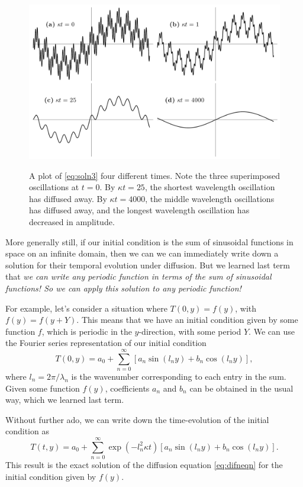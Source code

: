 \documentclass[11pt,twoside,a4paper]{article}
\begin{document}
\begin{figure}[ht]
  \centering
  \includegraphics[height=3in]{../figs/L18/decayThreeOscillations}
  \caption{A plot of \autoref{eq:soln3} four different times. Note the
    three superimposed oscillations at $t=0$.  By $\kappa t=25$, the
    shortest wavelength oscillation has diffused away. By
    $\kappa t=4000$, the middle wavelength oscillations has diffused
    away, and the longest wavelength oscillation has decreased in
    amplitude.}
  \label{fig:threeDecays}
\end{figure}

More generally still, if our initial condition is the sum of
sinusoidal functions in space on an infinite domain, then we can we
can immediately write down a solution for their temporal evolution
under diffusion.  But we learned last term that \textit{we can write
  any periodic function in terms of the sum of sinusoidal functions!
  So we can apply this solution to any periodic function!}

For example, let's consider a situation where $T(0,y) = f(y)$, with
$f(y) = f(y+Y)$.  This means that we have an initial condition given
by some function $f$, which is periodic in the $y$-direction, with
some period $Y$.  We can use the Fourier series representation of our
initial condition
\begin{equation}
  \label{eq:ICfourier}
  T(0,y) = a_0 + \sum_{n=0}^\infty\left[a_n\sin(l_n y) + b_n\cos(l_n y)\right],
\end{equation}
where $l_n=2\pi/\lambda_n$ is the wavenumber corresponding to each
entry in the sum.  Given some function $f(y)$, coefficients $a_n$ and
$b_n$ can be obtained in the usual way, which we learned last term.

Without further ado, we can write down the time-evolution of the
initial condition as
\begin{equation}
  \label{eq:solnfourier}
  T(t,y) = a_0 + \sum_{n=0}^\infty
  \exp\left(-l_n^2\kappa t\right)\left[a_n\sin(l_n y) + 
    b_n\cos(l_n y)\right].
\end{equation}
This result is the exact solution of the diffusion equation
\eqref{eq:difneqn} for the initial condition given by $f(y)$.
\end{document}
